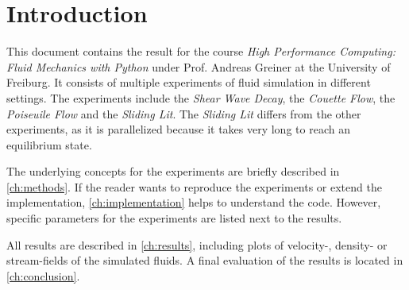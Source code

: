 \chapter{Introduction}

This document contains the result for the course \textit{High Performance Computing: Fluid Mechanics with Python} under Prof. Andreas Greiner at the University of Freiburg.
It consists of multiple experiments of fluid simulation in different settings.
The experiments include the \textit{Shear Wave Decay}, the \textit{Couette Flow}, the \textit{Poiseuile Flow} and the \textit{Sliding Lit}.
The \textit{Sliding Lit} differs from the other experiments, as it is parallelized because it takes very long to reach an equilibrium state.
\newline

The underlying concepts for the experiments are briefly described in \cref{ch:methods}.
If the reader wants to reproduce the experiments or extend the implementation, \cref{ch:implementation} helps to understand the code.
However, specific parameters for the experiments are listed next to the results.
\newline

All results are described in \cref{ch:results}, including plots of velocity-, density- or stream-fields of the simulated fluids.
A final evaluation of the results is located in \cref{ch:conclusion}.